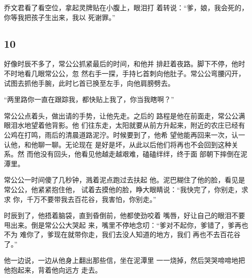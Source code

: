 乔文君看了看空位，拿起灵牌贴在小腹上，眼泪打
着转说：“爹，娘，我会死的，你等我把孩子生出来，我以
死谢罪。”
\newline

{\centering\subsection{10}}

好像时辰不多了，常公公抓紧最后的时间，和他并
排赶着夜路。脚下不停，他时不时地看几眼常公公，忽
然右手一探，手持匕首刺向他肚子。常公公弯腰闪开，
试图去抓他手腕，此时匕首已换至左手，向他肩膀劈去。

“两里路你一直在跟踪我，都快贴上我了，你当我瞎啊？”

常公公点着头，做出请的手势，让他先走。之后的
路程是他在前面走，常公公满眼泪水地望着他背影。他
们往东走，太阳就要从前方升起来，附近的农庄已经有
公鸡在打鸣，雨后的清晨道路泥泞。时候要到了，他希
望他能再回来一次，认一认他，和他聊一聊。无论现在
是好是坏，从此以后他们将再也不会回到这种关系。然
而他没有回头，他看见他越走越艰难，磕磕绊绊，终于面
部朝下摔倒在泥潭里。

常公公一时间傻了几秒钟，溅着泥点跑过去扶起
他。泥巴糊住了他的脸，看见是常公公，他紧紧抱住他，
试着去摸他的脸，睁大眼睛说：“我快完了，你别走，求求
你，千万不要带我去百花谷，我害怕，你别走。”

时辰到了，他捂着脑袋，直到昏倒前，他都使劲咬着
嘴唇，好让自己的眼泪不要甩出来。倒是常公公大哭起
来，嘴里不停地念叨：“爹对不起你，爹错了，爹再也不为
难你了，爹现在就带你走，我们去没人知道的地方，我们
再也不去百花谷了。”

他一边说，一边从他身上翻出那些信，坐在泥潭里
一一烧掉，然后哭哭啼啼地把他抱起来，背着他向远方
走去。

\newpage